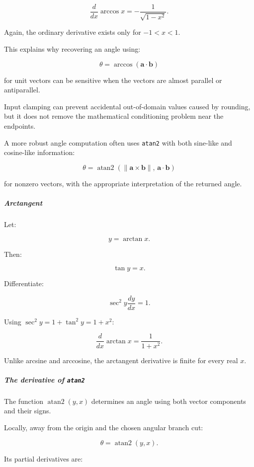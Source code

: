 \[
\boxed{\frac d{dx}\arccos x=-\frac1{\sqrt{1-x^2}}}.
\]

Again, the ordinary derivative exists only for \(-1<x<1\).

This explains why recovering an angle using:

\[
\theta=\arccos(\mathbf a\cdot\mathbf b)
\]

for unit vectors can be sensitive when the vectors are almost parallel or antiparallel.

Input clamping can prevent accidental out-of-domain values caused by rounding, but it does not remove the mathematical conditioning problem near the endpoints.

A more robust angle computation often uses \texttt{atan2} with both sine-like and cosine-like information:

\[
\theta=\operatorname{atan2} \left(\|\mathbf a\times\mathbf b\|,\, \mathbf a\cdot\mathbf b\right)
\]

for nonzero vectors, with the appropriate interpretation of the returned angle.

\subparagraph{Arctangent}\label{01-foundations-i-ch020-arctangent}

\hypertarget{01-foundations-i-ch020-arctangent}{}

Let:

\[
y=\arctan x.
\]

Then:

\[
\tan y=x.
\]

Differentiate:

\[
\sec^2y\frac{dy}{dx}=1.
\]

Using \(\sec^2y=1+\tan^2y=1+x^2\):

\[
\boxed{\frac d{dx}\arctan x=\frac1{1+x^2}}.
\]

Unlike arcsine and arccosine, the arctangent derivative is finite for every real \(x\).

\subparagraph{\texorpdfstring{The derivative of \texttt{atan2}}{The derivative of atan2}}\label{01-foundations-i-ch020-the-derivative-of-atan2}

\hypertarget{01-foundations-i-ch020-the-derivative-of-atan2}{}

The function \(\operatorname{atan2}(y,x)\) determines an angle using both vector components and their signs.

Locally, away from the origin and the chosen angular branch cut:

\[
\theta=\operatorname{atan2}(y,x).
\]

Its partial derivatives are:

